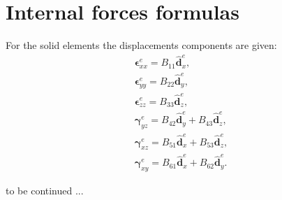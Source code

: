 

\chapter{Internal forces formulas}
\label{app:fu}

For the solid elements the displacements components are given:
\begin{eqnarray}
	\label{eq:strain}
	\boldsymbol{\epsilon}^e_{xx} = B_{11}\widehat{\textbf{d}}^e_{x},\\
	\boldsymbol{\epsilon}^e_{yy} = B_{22}\widehat{\textbf{d}}^e_{y},\\
	\boldsymbol{\epsilon}^e_{zz} = B_{33}\widehat{\textbf{d}}^e_{z},\\
	\boldsymbol{\gamma}^e_{yz} = B_{42}\widehat{\textbf{d}}^e_{y}+B_{43}\widehat{\textbf{d}}^e_{z},\\
	\boldsymbol{\gamma}^e_{xz} =  B_{51}\widehat{\textbf{d}}^e_{x}+B_{53}\widehat{\textbf{d}}^e_{z},\\
	\boldsymbol{\gamma}^e_{xy} =  B_{61}\widehat{\textbf{d}}^e_{x}+B_{62}\widehat{\textbf{d}}^e_{y}.
\end{eqnarray}

to be continued ...